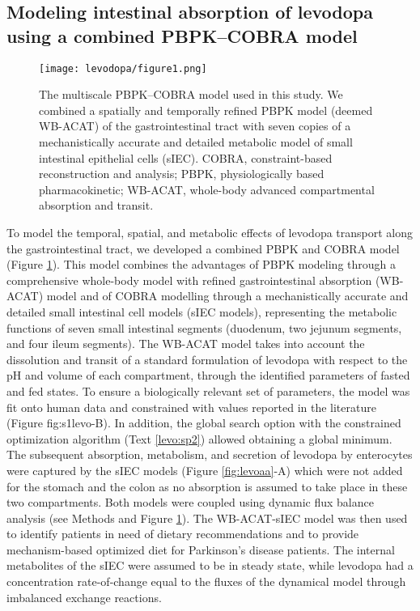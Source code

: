 \subsection{Modeling intestinal absorption of levodopa using a combined PBPK–COBRA model}
\begin{figure}[!htp]
\centering
	\texttt{[image: levodopa/figure1.png]}%
	\caption[Multiscale PBPK-COBRA model of the gut wall.]{The multiscale PBPK–COBRA model used in this study. We combined a spatially and temporally refined PBPK model (deemed WB-ACAT) of the gastrointestinal tract with seven copies of a mechanistically accurate and detailed metabolic model of small intestinal epithelial cells (sIEC). COBRA, constraint-based reconstruction and analysis; PBPK, physiologically based pharmacokinetic; WB-ACAT, whole-body advanced compartmental absorption and transit.}
	\label{fig:multiscale}
\end{figure}
To model the temporal, spatial, and metabolic effects of levodopa transport along the gastrointestinal tract, we developed a combined PBPK and COBRA model (Figure \ref{fig:multiscale}). This model combines the advantages of PBPK modeling through a comprehensive whole-body model with refined gastrointestinal absorption (WB-ACAT) model and of COBRA modelling through a mechanistically accurate and detailed small intestinal cell models (sIEC models), representing the metabolic functions of seven small intestinal segments (duodenum, two jejunum segments, and four ileum segments). The WB-ACAT model takes into account the dissolution and transit of a standard formulation of levodopa with respect to the pH and volume of each compartment, through the identified parameters of fasted and fed states. To ensure a biologically relevant set of parameters, the model was fit onto human data and constrained with values reported in the literature (Figure {fig:s1levo}-B). In addition, the global search option with the constrained optimization algorithm (Text \ref{levo:sp2}) allowed obtaining a global minimum. The subsequent absorption, metabolism, and secretion of levodopa by enterocytes were captured by the sIEC models (Figure \ref{fig:levoaa}-A) which were not added for the stomach and the colon as no absorption is assumed to take place in these two compartments. Both models were coupled using dynamic flux balance analysis (see Methods and  Figure \ref{fig:multiscale}). The WB-ACAT-sIEC model was then used to identify patients in need of dietary recommendations and to provide mechanism-based optimized diet for Parkinson's disease patients. The internal metabolites of the sIEC were assumed to be in steady state, while levodopa had a concentration rate-of-change equal to the fluxes of the dynamical model through imbalanced exchange reactions.
